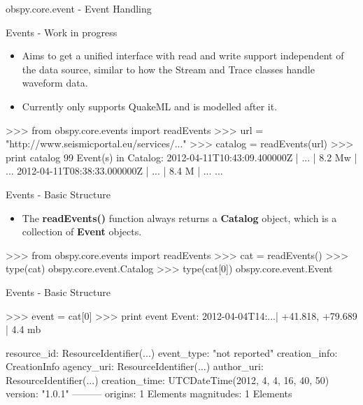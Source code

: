 \begin{frame}{}
    \begin{center}
        \textcolor{lmu@darkgreen}{\LARGE{obspy.core.event - Event Handling}}
    \end{center}
\end{frame}


\begin{frame}{Events - Work in progress}
    \begin{itemize}
        \item Aims to get a unified interface with read and write support independent of the data source, similar to how the Stream and Trace classes handle waveform data.
        \item Currently only supports QuakeML and is modelled after it.
    \end{itemize}
\begin{myColorBox}{0.95}{}
\begin{python}
>>> from obspy.core.events import readEvents
>>> url = "http://www.seismicportal.eu/services/..."
>>> catalog = readEvents(url)
>>> print catalog
99 Event(s) in Catalog:
2012-04-11T10:43:09.400000Z |  ... | 8.2 Mw | ...
2012-04-11T08:38:33.000000Z |  ... | 8.4 M  | ...
...
\end{python}
\end{myColorBox}
\end{frame}

\begin{frame}{Events - Basic Structure}
    \begin{itemize}
        \item The \textbf{readEvents()} function always returns a
            \textbf{Catalog} object, which is a collection of \textbf{Event}
            objects.
    \end{itemize}
\begin{myColorBox}{0.95}{}
\begin{python}
>>> from obspy.core.events import readEvents
>>> cat = readEvents()
>>> type(cat)
obspy.core.event.Catalog
>>> type(cat[0])
obspy.core.event.Event
\end{python}
\end{myColorBox}
\end{frame}

\begin{frame}{Events - Basic Structure}
\begin{myColorBox}{0.95}{}
\begin{python}
>>> event = cat[0]
>>> print event
Event:  2012-04-04T14:...| +41.818,  +79.689 | 4.4 mb

           resource_id: ResourceIdentifier(...)
            event_type: "not reported"
         creation_info: CreationInfo
            agency_uri: ResourceIdentifier(...)
            author_uri: ResourceIdentifier(...)
         creation_time: UTCDateTime(2012, 4, 4, 16, 40, 50)
               version: "1.0.1"
        ---------
                    origins: 1 Elements
                 magnitudes: 1 Elements
\end{python}
\end{myColorBox}
\end{frame}

